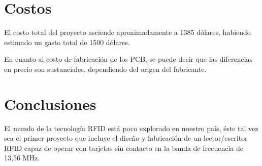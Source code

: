 \documentclass[%
        final,
        notitlepage,
        narroweqnarray,
        inline,
        ]{ieee}
\begin{document}



\section{Costos}

El costo total del proyecto asciende aproximadamente a 1385 dólares, habiendo 
estimado un gasto total de 1500 dólares.

En cuanto al costo de fabricación de los PCB, se puede decir
que las diferencias en precio son sustanciales, dependiendo
del origen del fabricante. 



\section{Conclusiones}
El mundo de la tecnología RFID está poco explorado en nuestro país, éste 
tal vez sea el primer proyecto que incluye el diseño y fabricación de un 
lector/escritor RFID capaz de operar con tarjetas sin contacto en la banda de
frecuencia de 13,56 MHz.
\end{document}
